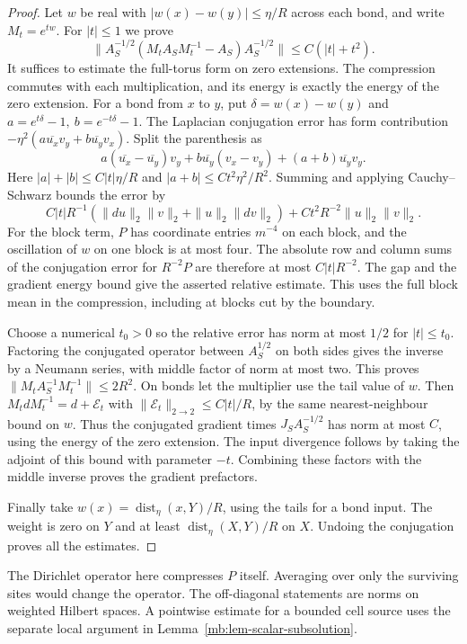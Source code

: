 \documentclass[11pt,letterpaper,reqno]{amsart}
\numberwithin{equation}{section}
\theoremstyle{definition}
\theoremstyle{remark}
\begin{document}
\begin{proof}
Let \(w\) be real with \(|w(x)-w(y)|\le\eta/R\) across each
bond, and write \(M_t=e^{tw}\). For \(|t|\le1\) we prove
\[
 \|A_S^{-1/2}(M_tA_SM_t^{-1}-A_S)A_S^{-1/2}\|
                                      \le C(|t|+t^2).
\]
It suffices to estimate the full-torus form on zero extensions.
The compression commutes with each multiplication, and its
energy is exactly the energy of the zero extension. For a
bond from \(x\) to \(y\), put \(\delta=w(x)-w(y)\) and
\(a=e^{t\delta}-1,\ b=e^{-t\delta}-1\).
The Laplacian conjugation error has form contribution
\(-\eta^2(a\overline{u_x}v_y+b\overline{u_y}v_x)\).
Split the parenthesis as
\[
 a(\overline{u_x}-\overline{u_y})v_y
 +b\overline{u_y}(v_x-v_y)+(a+b)\overline{u_y}v_y .
\]
Here \(|a|+|b|\le C|t|\eta/R\) and
\(|a+b|\le Ct^2\eta^2/R^2\). Summing and applying
Cauchy--Schwarz bounds the error by
\[
 C|t|R^{-1}(\|du\|_2\|v\|_2+\|u\|_2\|dv\|_2)
                          +Ct^2R^{-2}\|u\|_2\|v\|_2 .
\]
For the block term, \(P\) has coordinate entries \(m^{-4}\)
on each block, and the oscillation of \(w\) on one block is
at most four. The absolute row and column sums of the conjugation
error for \(R^{-2}P\) are therefore at most \(C|t|R^{-2}\).
The gap and the gradient energy bound give the asserted relative
estimate. This uses the full block mean in the compression,
including at blocks cut by the boundary.

Choose a numerical \(t_0>0\) so the relative error has norm
at most \(1/2\) for \(|t|\le t_0\). Factoring the conjugated
operator between \(A_S^{1/2}\) on both sides gives the inverse
by a Neumann series, with middle factor of norm at most two.
This proves \(\|M_tA_S^{-1}M_t^{-1}\|\le2R^2\).
On bonds let the multiplier use the tail value of \(w\).
Then \(M_t d M_t^{-1}=d+\mathcal E_t\) with
\(\|\mathcal E_t\|_{2\to2}\le C|t|/R\), by the same
nearest-neighbour bound on \(w\). Thus the conjugated gradient
times \(J_S A_S^{-1/2}\) has norm at most \(C\), using the
energy of the zero extension. The input divergence follows
by taking the adjoint of this bound with parameter \(-t\).
Combining these factors with the middle inverse proves the
gradient prefactors.

Finally take \(w(x)=\operatorname{dist}_\eta(x,Y)/R\), using
the tails for a bond input. The weight is zero on \(Y\)
and at least \(\operatorname{dist}_\eta(X,Y)/R\) on \(X\).
Undoing the conjugation proves all the estimates.
\end{proof}

The Dirichlet operator here compresses \(P\) itself. Averaging
over only the surviving sites would change the operator.
The off-diagonal statements are norms on weighted Hilbert
spaces. A pointwise estimate for a bounded cell source uses
the separate local argument in Lemma~\ref{mb:lem-scalar-subsolution}.
\end{document}

